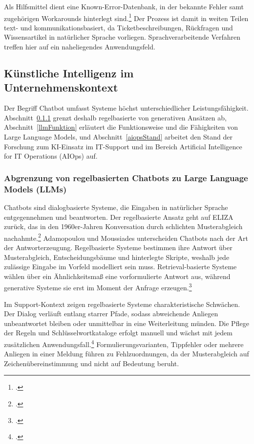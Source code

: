 Als Hilfsmittel dient eine Known-Error-Datenbank, in der bekannte Fehler samt zugeh\"origen Workarounds hinterlegt sind.\footcite[Vgl.][S.~449]{Tiemeyer2020} Der Prozess ist damit in weiten Teilen text- und kommunikationsbasiert, da Ticketbeschreibungen, R\"uckfragen und Wissensartikel in nat\"urlicher Sprache vorliegen. Sprachverarbeitende Verfahren treffen hier auf ein naheliegendes Anwendungsfeld.

\subsection{K\"unstliche Intelligenz im Unternehmenskontext}
\label{kiGrundlagen}

Der Begriff Chatbot umfasst Systeme h\"ochst unterschiedlicher Leistungsf\"ahigkeit. Abschnitt~\ref{chatbotAbgrenzung} grenzt deshalb regelbasierte von generativen Ans\"atzen ab, Abschnitt~\ref{llmFunktion} erl\"autert die Funktionsweise und die F\"ahigkeiten von Large Language Models, und Abschnitt~\ref{aiopsStand} arbeitet den Stand der Forschung zum KI-Einsatz im IT-Support und im Bereich Artificial Intelligence for IT Operations (AIOps) auf.

\subsubsection{Abgrenzung von regelbasierten Chatbots zu Large Language Models (LLMs)}
\label{chatbotAbgrenzung}

Chatbots sind dialogbasierte Systeme, die Eingaben in nat\"urlicher Sprache entgegennehmen und beantworten. Der regelbasierte Ansatz geht auf ELIZA zur\"uck, das in den 1960er-Jahren Konversation durch schlichten Musterabgleich nachahmte.\footcite[Vgl.][hier S.~2]{Adamopoulou2020a} Adamopoulou und Moussiades unterscheiden Chatbots nach der Art der Antworterzeugung. Regelbasierte Systeme bestimmen ihre Antwort \"uber Musterabgleich, Entscheidungsb\"aume und hinterlegte Skripte, weshalb jede zul\"assige Eingabe im Vorfeld modelliert sein muss. Retrieval-basierte Systeme w\"ahlen \"uber ein \"Ahnlichkeitsma{\ss} eine vorformulierte Antwort aus, w\"ahrend generative Systeme sie erst im Moment der Anfrage erzeugen.\footcite[Vgl.][S.~4]{Adamopoulou2020a}

Im Support-Kontext zeigen regelbasierte Systeme charakteristische Schw\"achen. Der Dialog verl\"auft entlang starrer Pfade, sodass abweichende Anliegen unbeantwortet bleiben oder unmittelbar in eine Weiterleitung m\"unden. Die Pflege der Regeln und Schl\"usselwortkataloge erfolgt manuell und w\"achst mit jedem zus\"atzlichen Anwendungsfall.\footcites[Vgl.][hier S.~378]{Adamopoulou2020b}[][S.~10]{Adamopoulou2020a} Formulierungsvarianten, Tippfehler oder mehrere Anliegen in einer Meldung f\"uhren zu Fehlzuordnungen, da der Musterabgleich auf Zeichen\"ubereinstimmung und nicht auf Bedeutung beruht.

